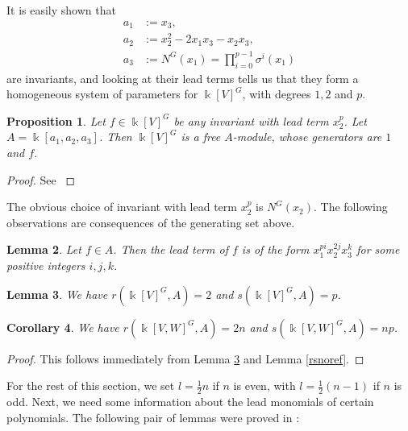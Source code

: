 \documentclass[a4paper]{amsart}
\newcommand{\kk}{\Bbbk}
\newtheorem{Lemma}{Lemma}
\newtheorem{Corollary}[Lemma]{Corollary}
\newtheorem{prop}[Lemma]{Proposition}
\newtheorem*{Corollary of Conjecture}{Corollary of Conjecture}
\theoremstyle{definition}
\theoremstyle{remark}
\theoremstyle{Acknowledgments}
\begin{document}
 It is easily shown that
\begin{align*} a_1 &:= x_3,\\ a_2 &:= x_2^2-2x_1x_3-x_2x_3,\\ a_3 &:= N^G(x_1)=\prod_{i=0}^{p-1} \sigma^i(x_1) \end{align*}
are invariants, and looking at their lead terms tells us that they form a homogeneous system of parameters for $\kk[V]^G$, with degrees $1,2$ and $p$. 

\begin{prop}\label{gensv3} Let $f \in \kk[V]^G$ be any invariant with lead term $x_2^p$. Let $A = \kk[a_1,a_2,a_3]$. Then $\kk[V]^G$ is a free $A$-module, whose generators are $1$ and $f$.
\end{prop}

\begin{proof} See \cite[Proposition~12]{ElmerCov}
\end{proof}

The obvious choice of invariant with lead term $x_2^p$ is $N^G(x_2)$. 
The following observations are consequences of the generating set above.

\begin{Lemma}\label{obs} 
Let $f \in A$. Then the lead term of $f$ is of the form $x_1^{pi}x_2^{2j}x_3^k$ for some positive integers $i,j,k$.
\end{Lemma}

\begin{Lemma}\label{randsofkv3g} We have $r(\kk[V]^G,A) = 2$ and $s(\kk[V]^G,A) = p$.
\end{Lemma}



\begin{Corollary}
We have $r(\kk[V,W]^G, A) = 2n$ and $s(\kk[V,W]^G,A) =np$.
\end{Corollary}

\begin{proof} This follows immediately from Lemma \ref{randsofkv3g} and Lemma \ref{rsnoref}.
\end{proof}

For the rest of this section, we set $l = \frac12 n$ if $n$ is even, with $l = \frac12(n-1)$ if $n$ is odd. Next, we need some information about the lead monomials of certain polynomials. The following pair of lemmas were proved in \cite{ElmerCov}:
\end{document}
